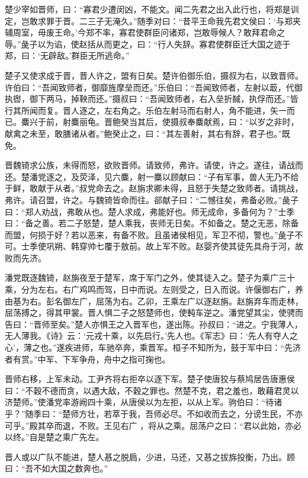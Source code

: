 \documentclass[a4paper,12pt,UTF8,twoside]{ctexbook}
\begin{document}
楚少宰如晋师，曰：“寡君少遭闵凶，不能文。闻二先君之出入此行也，将郑是训定，岂敢求罪于晋。二三子无淹久。”随季对曰：“昔平王命我先君文侯曰：‘与郑夹辅周室，毋废王命。’今郑不率，寡君使群臣问诸郑，岂敢辱候人？敢拜君命之辱。”彘子以为谄，使赵括从而更之，曰：“行人失辞。寡君使群臣迁大国之迹于郑，曰：‘无辟敌。’群臣无所逃命。”

楚子又使求成于晋，晋人许之，盟有日矣。楚许伯御乐伯，摄叔为右，以致晋师。许伯曰：“吾闻致师者，御靡旌摩垒而还。”乐伯曰：“吾闻致师者，左射以菆，代御执辔，御下两马，掉鞅而还。”摄叔曰：“吾闻致师者，右入垒折馘，执俘而还。”皆行其所闻而复。晋人逐之，左右角之。乐伯左射马而右射人，角不能进，矢一而已。麋兴于前，射麋丽龟。晋鲍癸当其后，使摄叔奉麋献焉，曰：“以岁之非时，献禽之未至，敢膳诸从者。”鲍癸止之，曰：“其左善射，其右有辞，君子也。”既免。

晋魏锜求公族，未得而怒，欲败晋师。请致师，弗许。请使，许之。遂往，请战而还。楚潘党逐之，及荧泽，见六麋，射一麋以顾献曰：“子有军事，兽人无乃不给于鲜，敢献于从者。”叔党命去之。赵旃求卿未得，且怒于失楚之致师者。请挑战，弗许。请召盟，许之。与魏锜皆命而往。郤献子曰：“二憾往矣，弗备必败。”彘子曰：“郑人劝战，弗敢从也。楚人求成，弗能好也。师无成命，多备何为？”士季曰：“备之善。若二子怒楚，楚人乘我，丧师无日矣。不如备之。楚之无恶，除备而盟，何损于好？若以恶来，有备不败。且虽诸侯相见，军卫不彻，警也。”彘子不可。士季使巩朔、韩穿帅七覆于敖前。故上军不败。赵婴齐使其徒先具舟于河，故败而先济。

潘党既逐魏锜，赵旃夜至于楚军，席于军门之外，使其徒入之。楚子为乘广三十乘，分为左右。右广鸡鸣而驾，日中而说。左则受之，日入而说。许偃御右广，养由基为右。彭名御左广，屈荡为右。乙卯，王乘左广以逐赵旃。赵旃弃车而走林，屈荡搏之，得其甲裳。晋人惧二子之怒楚师也，使軘车逆之。潘党望其尘，使骋而告曰：“晋师至矣。”楚人亦惧王之入晋军也，遂出陈。孙叔曰：“进之。宁我薄人，无人薄我。《诗》云：‘元戎十乘，以先启行。’先人也。《军志》曰：‘先人有夺人之心’，薄之也。”遂疾进师，车驰卒奔，乘晋军。桓子不知所为，鼓于军中曰：“先济者有赏。”中军、下军争舟，舟中之指可掬也。

晋师右移，上军未动。工尹齐将右拒卒以逐下军。楚子使唐狡与蔡鸠居告唐惠侯曰：“不穀不德而贪，以遇大敌，不穀之罪也。然楚不克，君之羞也，敢藉君灵以济楚师。”使潘党率游阙四十乘，从唐侯以为左拒，以从上军。驹伯曰：“待诸乎？”随季曰：“楚师方壮，若萃于我，吾师必尽。不如收而去之，分谤生民，不亦可乎。”殿其卒而退，不败。王见右广 ，将从之乘。屈荡户之曰：“君以此始，亦必以终。”自是楚之乘广先左。

晋人或以广队不能进，楚人惎之脱扃，少进，马还，又惎之拔旆投衡，乃出。顾曰：“吾不如大国之数奔也。”
\end{document}
